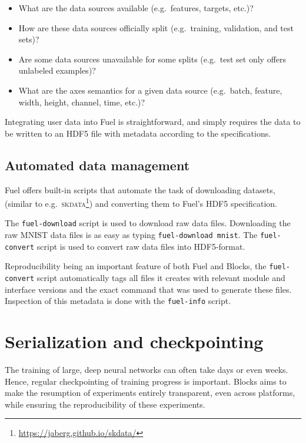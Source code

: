 \documentclass[twoside,11pt]{article}
\begin{document}
\begin{itemize}
  \item What are the data sources available (e.g.\ features, targets, etc.)?
  \item How are these data sources officially split (e.g.\ training, validation,
        and test sets)?
  \item Are some data sources unavailable for some splits (e.g.\ test set only
        offers unlabeled examples)?
  \item What are the axes semantics for a given data source (e.g.\ batch,
        feature, width, height, channel, time, etc.)?
\end{itemize}

Integrating user data into Fuel is straightforward, and simply requires the data
to be written to an HDF5 file with metadata according to the specifications.

\subsection{Automated data management}

Fuel offers built-in scripts that automate the task of downloading datasets,
(similar to e.g.\ \textsc{skdata}\footnote{\url{https://jaberg.github.io/skdata/}})
and converting them to Fuel's HDF5 specification.

The \lstinline$fuel-download$ script is used to download raw data files.
Downloading the raw MNIST data files is as easy as typing
\lstinline$fuel-download mnist$. The \lstinline$fuel-convert$ script is used to
convert raw data files into HDF5-format.

Reproducibility being an important feature of both Fuel and Blocks, the
\lstinline$fuel-convert$ script automatically tags all files it creates with
relevant module and interface versions and the exact command that was used to
generate these files. Inspection of this metadata is done with the
\lstinline$fuel-info$ script.

\section{Serialization and checkpointing}

The training of large, deep neural networks can often take days or even weeks.
Hence, regular checkpointing of training progress is important. Blocks aims to
make the resumption of experiments entirely transparent, even across platforms,
while ensuring the reproducibility of these experiments.
\end{document}
